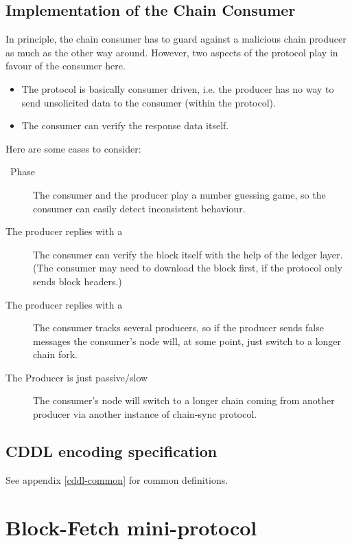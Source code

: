 \subsection{Implementation of the Chain Consumer}
In principle, the chain consumer has to guard against a malicious chain producer
as much as the other way around.
However, two aspects of the protocol play in favour of the consumer here.
\begin{itemize}
  \item The protocol is basically consumer driven, i.e. the producer has no way to send unsolicited
data to the consumer (within the protocol).
  \item The consumer can verify the response data itself.
\end{itemize}
Here are some cases to consider:
\begin{description}
\item[\MsgFindIntersect~Phase]
  The consumer and the producer play a number guessing game, so the consumer can easily detect
  inconsistent behaviour.
\item[The producer replies with a \MsgRollForward] The consumer can verify the block itself
  with the help of the ledger layer.
  (The consumer may need to download the block first, if the protocol only sends block headers.)
\item[The producer replies with a \MsgRollBackward] The consumer tracks several producers, so
  if the producer sends false \MsgRollBackward{} messages the consumer's node
  will, at some point, just switch to a longer chain fork.
\item[The Producer is just passive/slow] The consumer's node will switch to
  a longer chain coming from another producer via another instance of
    chain-sync protocol.
\end{description}

\subsection{CDDL encoding specification}

See appendix \ref{cddl-common} for common definitions.

\section{Block-Fetch mini-protocol}
\label{block-fetch-protocol}

